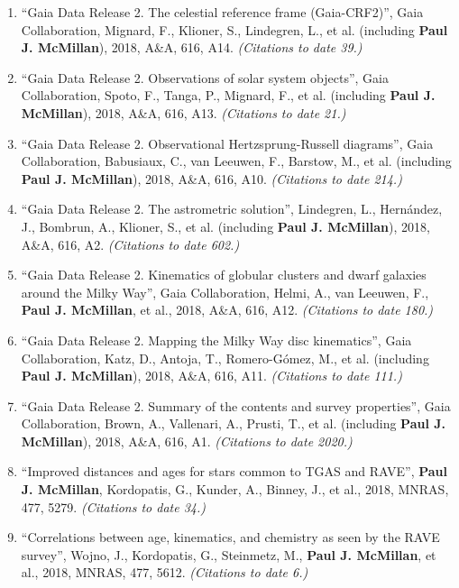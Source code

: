 \documentclass{resume}
\begin{document}
\begin{enumerate}
\item ``Gaia Data Release 2. The celestial reference frame (Gaia-CRF2)'', Gaia Collaboration, Mignard, F., Klioner, S., Lindegren, L., et al. (including \textbf{Paul J. McMillan}), 2018, A\&A, 616, A14. \textit{(Citations to date 39.)}

\item ``Gaia Data Release 2. Observations of solar system objects'', Gaia Collaboration, Spoto, F., Tanga, P., Mignard, F., et al. (including \textbf{Paul J. McMillan}), 2018, A\&A, 616, A13. \textit{(Citations to date 21.)}

\item ``Gaia Data Release 2. Observational Hertzsprung-Russell diagrams'', Gaia Collaboration, Babusiaux, C., van Leeuwen, F., Barstow, M., et al. (including \textbf{Paul J. McMillan}), 2018, A\&A, 616, A10. \textit{(Citations to date 214.)}

\item ``Gaia Data Release 2. The astrometric solution'', Lindegren, L., Hern\'andez, J., Bombrun, A., Klioner, S., et al. (including \textbf{Paul J. McMillan}), 2018, A\&A, 616, A2. \textit{(Citations to date 602.)}

\item ``Gaia Data Release 2. Kinematics of globular clusters and dwarf galaxies around the Milky Way'', Gaia Collaboration, Helmi, A., van Leeuwen, F., \textbf{Paul J. McMillan}, et al., 2018, A\&A, 616, A12. \textit{(Citations to date 180.)}

\item ``Gaia Data Release 2. Mapping the Milky Way disc kinematics'', Gaia Collaboration, Katz, D., Antoja, T., Romero-G\'omez, M., et al. (including \textbf{Paul J. McMillan}), 2018, A\&A, 616, A11. \textit{(Citations to date 111.)}

\item ``Gaia Data Release 2. Summary of the contents and survey properties'', Gaia Collaboration, Brown, A., Vallenari, A., Prusti, T., et al. (including \textbf{Paul J. McMillan}), 2018, A\&A, 616, A1. \textit{(Citations to date 2020.)}

\item ``Improved distances and ages for stars common to TGAS and RAVE'', \textbf{Paul J. McMillan}, Kordopatis, G., Kunder, A., Binney, J., et al., 2018, MNRAS, 477, 5279. \textit{(Citations to date 34.)}

\item ``Correlations between age, kinematics, and chemistry as seen by the RAVE survey'', Wojno, J., Kordopatis, G., Steinmetz, M., \textbf{Paul J. McMillan}, et al., 2018, MNRAS, 477, 5612. \textit{(Citations to date 6.)}


\end{enumerate}
\end{document}
